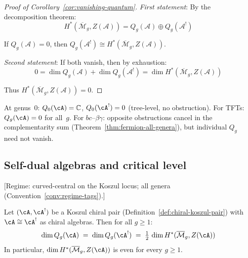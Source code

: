 \begin{proof}[Proof of Corollary~\ref{cor:vanishing-quantum}]
\emph{First statement}: By the decomposition theorem:
\begin{equation}
H^*(\overline{\mathcal{M}}_g, Z(\mathcal{A})) = Q_g(\mathcal{A}) \oplus Q_g(\mathcal{A}^!)
\end{equation}

If $Q_g(\mathcal{A}) = 0$, then $Q_g(\mathcal{A}^!) \cong H^*(\overline{\mathcal{M}}_g, 
Z(\mathcal{A}))$.

\emph{Second statement}: If both vanish, then by exhaustion:
\begin{equation}
0 = \dim Q_g(\mathcal{A}) + \dim Q_g(\mathcal{A}^!) = \dim H^*(\overline{\mathcal{M}}_g, 
Z(\mathcal{A}))
\end{equation}

Thus $H^*(\overline{\mathcal{M}}_g, Z(\mathcal{A})) = 0$.
\end{proof}

\begin{remark}
At genus~$0$: $Q_0(\cA)=\mathbb{C}$, $Q_0(\cA^!)=0$ (tree-level,
no obstruction).
For TFTs: $Q_g(\cA)=0$ for all~$g$.
For $bc$--$\beta\gamma$: opposite obstructions cancel in the
complementarity sum (Theorem~\ref{thm:fermion-all-genera}), but
individual $Q_g$ need not vanish.
\end{remark}

\subsection{Self-dual algebras and critical level}

\begin{theorem}\label{thm:self-dual-halving}
\textup{[Regime: curved-central on the Koszul locus; all genera
\textup{(}Convention~\textup{\ref{conv:regime-tags})}.]}

Let $(\cA, \cA^!)$ be a Koszul chiral pair
(Definition~\ref{def:chiral-koszul-pair}) with $\cA \cong \cA^!$
as chiral algebras.  Then for all $g \geq 1$:
\begin{equation}\label{eq:self-dual-halving}
\dim Q_g(\cA) \;=\; \dim Q_g(\cA^!)
\;=\; \tfrac{1}{2}\,\dim H^*(\overline{\mathcal{M}}_g, Z(\cA))
\end{equation}
In particular, $\dim H^*(\overline{\mathcal{M}}_g, Z(\cA))$ is even
for every $g \geq 1$.
\end{theorem}

